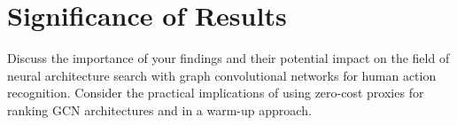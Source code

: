 \section{Significance of Results}

Discuss the importance of your findings and their potential impact on the field of neural architecture search with graph convolutional networks for human action recognition. Consider the practical implications of using zero-cost proxies for ranking \gls{GCN} architectures and in a warm-up approach.

\begin{comment}
\subsection{RQ1:}

Har lagt til dette i første kap om RQ 1. 
\end{comment}
\begin{comment}
\subsection{RQ2:}
The findings from this study carry significant implications for the field of \gls{NAS}, particularly in terms of performance estimation and computational efficiency working with \gls{GCN}. By identifying the optimal warm-up points for different zero-cost proxies, we can potentially halt the training process much earlier than traditionally done, without sacrificing the accuracy and reliability of performance estimation.

This early stopping of training can lead to substantial reductions in computational workload and search costs, making the \gls{NAS} process more efficient and accessible to a wider range of researchers and practitioners. Additionally, the improved performance prediction facilitated by the warm-up phase enables more effective exploration of the search space in \gls{NAS}, leading to the discovery of better architectures. 

Notably, the reduced computational demands also result lessening the environmental impact. By decreasing the training time and computational resources required for \gls{NAS}, we can significantly lower the energy consumption and the associated carbon footprint of the process. This aligns with the growing global concern for sustainable practices in artificial intelligence research and development.

In conclusion, the results of this study provide a solid foundation for further research into the application of warm-up with zero-cost proxies in \gls{NAS}. Future studies could investigate the generalizability of these findings across different datasets and tasks or explore ways to combine multiple zero-cost proxies for even more accurate and reliable performance estimation.

\end{comment}
